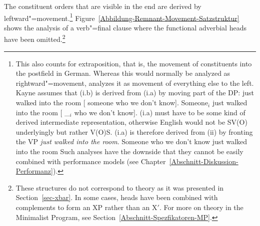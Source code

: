 The constituent orders that are visible in the end are derived by leftward"=movement.\footnote{\label{fn-Kayne-Extraposition}%
	This also counts for extraposition, that is, the movement of constituents into the postfield
	in German. Whereas this would normally be analyzed as rightward"=movement, \citet[Chapter~9]{Kayne94a-u} analyzes
	it as movement of everything else to the left. Kayne assumes that (i.b) is derived from (i.a) by moving part of the 
	DP:
\eal
\ex just walked into the room [ someone who we don't know].
\ex Someone$_i$ just walked into the room [ \_$_i$ who we don't know].
\zl
(i.a) must have to be some kind of derived intermediate representation, otherwise English would not be SV(O) underlyingly but rather V(O)S.
(i.a) is therefore derived from (ii) by fronting the VP \emph{just walked into the room}.
\ea
Someone who we don't know just walked into the room
\z
Such analyses have the downside that they cannot be easily combined with performance models (see Chapter~\ref{Abschnitt-Diskussion-Performanz}).%
} 
Figure~\vref{Abbildung-Remnant-Movement-Satzstruktur} shows the analysis of a verb"=final clause where the functional adverbial heads have been
omitted.\footnote{%
	These structures do not correspond to \xbar theory as it was presented in Section~\ref{sec-xbar}. In some cases, heads have been combined
	with complements to form an XP rather than an X$'$. For more on \xbar theory in the Minimalist Program, 
	see Section~\ref{Abschnitt-Spezfikatoren-MP}.
}
